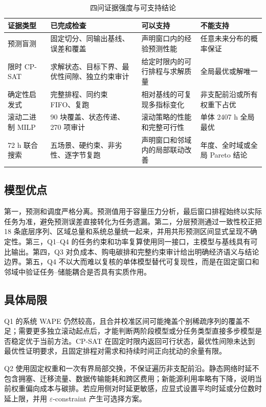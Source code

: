 \begin{table}[H]
  \centering
  \caption{四问证据强度与可支持结论}
  \label{tab:evidence-strength}
  \small
  \begin{tabularx}{\textwidth}{p{}p{}p{}X}
    \toprule
    证据类型 & 已完成检查 & 可以支持 & 不能支持 \\
    \midrule
    预测盲测 & 固定切分、同输出基线、误差和覆盖 & 声明窗口内的经验预测性能 & 任意未来分布的概率保证 \\
    限时 CP-SAT & 求解状态、目标下界、最优性间隙、独立约束审计 & 给定时限内的可行排程与求解质量 & 全局最优或解唯一 \\
    确定性启发式 & 完整排程、同约束 FIFO、复跑 & 相对基线的可复现多指标变化 & 非支配前沿或所有权重下占优 \\
    滚动二进制 MILP & 90 块覆盖、状态传递、270 项审计 & 滚动策略的性能和完整可行性 & 单体 2407 h 全局最优 \\
    72 h 联合搜索 & 五场景、硬约束、非劣性、逐字节复跑 & 声明窗口和邻域内的局部联动改善 & 年度、全时域或全局 Pareto 结论 \\
    \bottomrule
  \end{tabularx}
\end{table}

\subsection{模型优点}

第一，预测和调度严格分离。预测值用于容量压力分析，最后窗口排程始终以实际任务为准，避免预测误差直接转化为任务遗漏。第二，分层预测通过一致性校正把 18 条底层序列、区域总量和系统总量统一起来，并用共形预测区间显式呈现不确定性。第三，Q1--Q4 的任务约束和功率复算使用同一接口，主模型与基线具有可比输出。第四，Q3 对负成本、购电碳排和完整约束审计给出明确经济语义与结论边界。第五，Q4 不以大而难以复核的单体模型替代可复现性，而是在固定窗口和邻域中验证任务--储能耦合是否具有实质作用。

\subsection{具体局限}

Q1 的系统 WAPE 仍然较高，且合并校准区间可能掩盖个别稀疏序列的覆盖不足；需要更多独立滚动起点后，才能判断两阶段模型或分任务类型直接多步模型是否稳定优于当前方法。CP-SAT 在固定时限内返回可行状态，最优性间隙未达到最优性证明要求，且固定排程对需求和持续时间正向扰动的余量有限。

Q2 使用固定权重和一次有界局部交换，不保证遍历非支配前沿。静态网络时延不包含拥塞、迁移流量、数据传输能耗和跨区费用；新能源利用率略有下降，说明当前权重偏向成本与碳排。若应用侧对时延更敏感，应显式设置平均时延或分位数时延上限，并用 $\varepsilon$-constraint 产生可选择方案。


